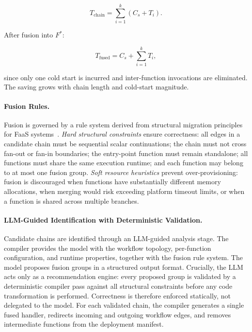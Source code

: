 \documentclass[runningheads]{llncs}
\begin{document}
\begin{equation}
T_{\text{chain}} = \sum_{i=1}^{k} (C_s + T_i).
\end{equation}

After fusion into $F^{*}$:

\begin{equation}
T_{\text{fused}} = C_s + \sum_{i=1}^{k} T_i,
\end{equation}

since only one cold start is incurred and inter-function invocations are eliminated. The saving grows with chain length and cold-start magnitude.

\paragraph{Fusion Rules.}
Fusion is governed by a rule system derived from structural migration principles for FaaS systems~\cite{wurz2020migrating}. \emph{Hard structural constraints} ensure correctness: all edges in a candidate chain must be sequential scalar continuations; the chain must not cross fan-out or fan-in boundaries; the entry-point function must remain standalone; all functions must share the same execution runtime; and each function may belong to at most one fusion group. \emph{Soft resource heuristics} prevent over-provisioning: fusion is discouraged when functions have substantially different memory allocations, when merging would risk exceeding platform timeout limits, or when a function is shared across multiple branches.

\paragraph{LLM-Guided Identification with Deterministic Validation.}
Candidate chains are identified through an LLM-guided analysis stage. The compiler provides the model with the workflow topology, per-function configuration, and runtime properties, together with the fusion rule system. The model proposes fusion groups in a structured output format. Crucially, the LLM acts only as a recommendation engine: every proposed group is validated by a deterministic compiler pass against all structural constraints before any code transformation is performed. Correctness is therefore enforced statically, not delegated to the model. For each validated chain, the compiler generates a single fused handler, redirects incoming and outgoing workflow edges, and removes intermediate functions from the deployment manifest.
\end{document}
